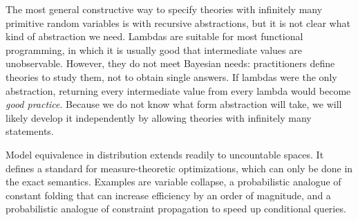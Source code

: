 The most general constructive way to specify theories with infinitely many primitive random variables is with recursive abstractions, but it is not clear what kind of abstraction we need. Lambdas are suitable for most functional programming, in which it is usually good that intermediate values are unobservable. However, they do not meet Bayesian needs: practitioners define theories to study them, not to obtain single answers. If lambdas were the only abstraction, returning every intermediate value from every lambda would become \textit{good practice}. Because we do not know what form abstraction will take, we will likely develop it independently by allowing theories with infinitely many statements.

Model equivalence in distribution extends readily to uncountable spaces. It defines a standard for measure-theoretic optimizations, which can only be done in the exact semantics. Examples are variable collapse, a probabilistic analogue of constant folding that can increase efficiency by an order of magnitude, and a probabilistic analogue of constraint propagation to speed up conditional queries.

